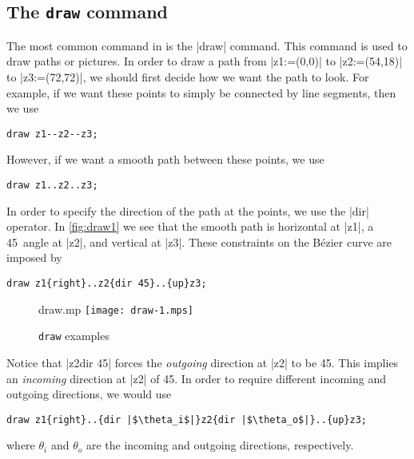 \subsection{The \texttt{draw} command}

The most common command in \MP{} is the |draw| command.  This command is
used to draw paths or pictures.  In order to draw a path from
|z1:=(0,0)| to |z2:=(54,18)| to |z3:=(72,72)|, we should first decide
how we want the path to look.  For example, if we want these points to
simply be connected by line segments, then we use

\begin{lstlisting}[style=MP]
draw z1--z2--z3;
\end{lstlisting}

However, if we want a smooth path between these points, we use

\begin{lstlisting}[style=MP]
draw z1..z2..z3;
\end{lstlisting}

In order to specify the direction of the path at the points, we use the
|dir| operator.  In \autoref{fig:draw1} we see that the smooth path is
horizontal at |z1|, a 45\textdegree\ angle at |z2|, and vertical at
|z3|.  These constraints on the B\'{e}zier curve are imposed by

\begin{lstlisting}[style=MP]
draw z1{right}..z2{dir 45}..{up}z3;
\end{lstlisting}

\begin{figure}
  \begin{withattachment}{draw.mp}
    \centering
    \texttt{[image: draw-1.mps]}
  \end{withattachment}
  \caption{\texttt{draw} examples}
  \label{fig:draw1}
\end{figure}

Notice that |z2{dir 45}| forces the \textit{outgoing} direction at |z2|
to be 45\textdegree.  This implies an \textit{incoming} direction at
|z2| of 45\textdegree.  In order to require different incoming and
outgoing directions, we would use

\begin{lstlisting}[style=MP]
draw z1{right}..{dir |$\theta_i$|}z2{dir |$\theta_o$|}..{up}z3;
\end{lstlisting}
where $\theta_i$ and $\theta_o$ are the incoming and outgoing
directions, respectively.
